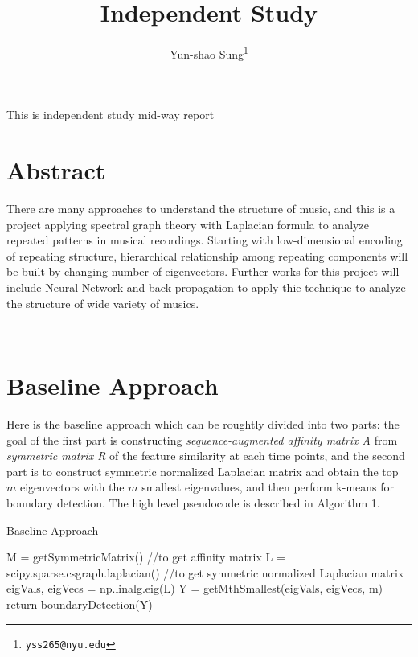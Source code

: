 \documentclass[final]{siamltexmm}
\title{Independent Study}
\author{Yun-shao Sung\thanks{\tt yss265@nyu.edu} }
\begin{document}
\maketitle

\begin{Note}
This is independent study mid-way report
\end{Note}

\pagestyle{myheadings}
\thispagestyle{plain}

\section{Abstract}
There are many approaches to understand the structure of music, and this is a project applying spectral graph theory with Laplacian formula to analyze repeated patterns in musical recordings. Starting with low-dimensional encoding of repeating structure, hierarchical relationship among repeating components will be built by changing number of eigenvectors. Further works for this project will include Neural Network and back-propagation to apply thie technique to analyze the structure of wide variety of musics.

\\
\section{Baseline Approach}
Here is the baseline approach which can be roughtly divided into two parts: the goal of the first part is constructing \textit{sequence-augmented affinity matrix A} from \textit{symmetric matrix R} of the feature similarity at each time points, and the second part is to construct symmetric normalized Laplacian matrix and obtain the top $m$ eigenvectors with the $m$ smallest eigenvalues, and then perform k-means for boundary detection. The high level pseudocode is described in Algorithm 1.

\begin{algorithm}[htb]
  \caption{Baseline Approach}
  \label{algo:SC}
\begin{algorithmic}[1]
  \STATE M = getSymmetricMatrix() //to get affinity matrix
  \STATE L = scipy.sparse.csgraph.laplacian() //to get symmetric normalized Laplacian matrix
  \STATE eigVals, eigVecs = np.linalg.eig(L)
  \STATE Y = getMthSmallest(eigVals, eigVecs, m)
  \STATE return boundaryDetection(Y)
\end{algorithmic}
\end{algorithm}
\end{document}
